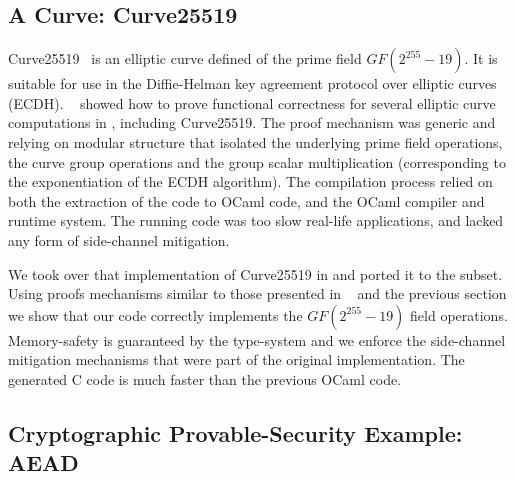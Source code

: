 
\subsection{A Curve: Curve25519}
Curve25519~\cite{curve25519} is an elliptic curve defined of the prime field
$GF(2^{255}-19)$. It is suitable for use in the Diffie-Helman key agreement
protocol over elliptic curves (ECDH). ~\cite{ZBB16} showed how to prove functional
correctness for several elliptic curve computations in \fstar, including Curve25519.
The proof mechanism was generic and relying on modular structure that isolated the
underlying prime field operations, the curve group operations and the group scalar multiplication
(corresponding to the exponentiation of the ECDH algorithm).
The compilation process relied on both the extraction of the \fstar code to OCaml code, and
the OCaml compiler and runtime system. The running code was too slow real-life applications,
and lacked any form of side-channel mitigation.

We took over that implementation of Curve25519 in \fstar and ported it to the \lowstar subset. Using
proofs mechanisms similar to those presented in ~\cite{ZBB16} and the previous section we
show that our \lowstar code correctly implements the $GF(2^{255}-19)$ field operations. Memory-safety
is guaranteed by the \lowstar type-system and we enforce the side-channel mitigation mechanisms
that were part of the original implementation. The generated C code is much faster than the
previous OCaml code.
\fi%


\subsection{Cryptographic Provable-Security Example: AEAD}
\label{sec:crypto}

